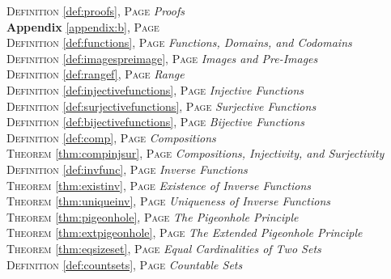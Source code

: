 \begin{multicols}{2}
{\textsc{Definition} \ref{def:proofs}, \textsc{Page} \pageref{def:proofs} \textit{Proofs} \\
\textbf{Appendix} \ref{appendix:b}, \textsc{Page} \pageref{appendix:b} \\
\textsc{Definition} \ref{def:functions}, \textsc{Page} \pageref{def:functions} \textit{Functions, Domains, and Codomains} \\
\textsc{Definition} \ref{def:imagespreimage}, \textsc{Page} \pageref{def:imagespreimage} \textit{Images and Pre-Images} \\
\textsc{Definition} \ref{def:rangef}, \textsc{Page} \pageref{def:rangef} \textit{Range} \\
\textsc{Definition} \ref{def:injectivefunctions}, \textsc{Page} \pageref{def:injectivefunctions} \textit{Injective Functions} \\
\textsc{Definition} \ref{def:surjectivefunctions}, \textsc{Page} \pageref{def:surjectivefunctions} \textit{Surjective Functions} \\
\textsc{Definition} \ref{def:bijectivefunctions}, \textsc{Page} \pageref{def:bijectivefunctions} \textit{Bijective Functions} \\
\textsc{Definition} \ref{def:comp}, \textsc{Page} \pageref{def:comp} \textit{Compositions} \\
\textsc{Theorem} \ref{thm:compinjsur}, \textsc{Page} \pageref{thm:compinjsur} \textit{Compositions, Injectivity, and Surjectivity} \\
\textsc{Definition} \ref{def:invfunc}, \textsc{Page} \pageref{def:invfunc} \textit{Inverse Functions} \\
\textsc{Theorem} \ref{thm:existinv}, \textsc{Page} \pageref{thm:existinv} \textit{Existence of Inverse Functions} \\
\textsc{Theorem} \ref{thm:uniqueinv}, \textsc{Page} \pageref{thm:uniqueinv} \textit{Uniqueness of Inverse Functions} \\
\textsc{Theorem} \ref{thm:pigeonhole}, \textsc{Page} \pageref{thm:pigeonhole} \textit{The Pigeonhole Principle} \\
\textsc{Theorem} \ref{thm:extpigeonhole}, \textsc{Page} \pageref{thm:extpigeonhole} \textit{The Extended Pigeonhole Principle} \\
\textsc{Theorem} \ref{thm:eqsizeset}, \textsc{Page} \pageref{thm:eqsizeset} \textit{Equal Cardinalities of Two Sets} \\
\textsc{Definition} \ref{def:countsets}, \textsc{Page} \pageref{def:countsets} \textit{Countable Sets} \\

      }
\end{multicols}

